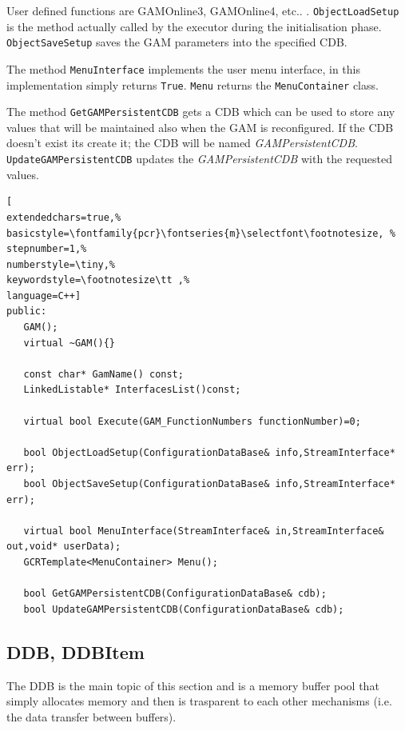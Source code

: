 User defined functions are GAMOnline3, GAMOnline4, etc.. . \texttt{ObjectLoadSetup} is the method actually called by the executor during the initialisation phase. \texttt{ObjectSaveSetup} saves the GAM parameters into the specified CDB.

The method \texttt{MenuInterface} implements the user menu interface, in this implementation simply returns \texttt{True}. \texttt{Menu} returns the \texttt{MenuContainer} class.

The method \texttt{GetGAMPersistentCDB} gets a CDB which can be used to store any values that will be maintained also when the GAM is reconfigured. If the CDB doesn't exist its create it; the CDB will be named \textit{GAMPersistentCDB}. \texttt{UpdateGAMPersistentCDB} updates the \textit{GAMPersistentCDB} with the requested values.

\begin{lstlisting}[
extendedchars=true,%
basicstyle=\fontfamily{pcr}\fontseries{m}\selectfont\footnotesize, %
stepnumber=1,%
numberstyle=\tiny,%
keywordstyle=\footnotesize\tt ,%
language=C++]
public:
   GAM();
   virtual ~GAM(){}

   const char* GamName() const;
   LinkedListable* InterfacesList()const;

   virtual bool Execute(GAM_FunctionNumbers functionNumber)=0;

   bool ObjectLoadSetup(ConfigurationDataBase& info,StreamInterface* err);
   bool ObjectSaveSetup(ConfigurationDataBase& info,StreamInterface* err);

   virtual bool MenuInterface(StreamInterface& in,StreamInterface& out,void* userData);
   GCRTemplate<MenuContainer> Menu();

   bool GetGAMPersistentCDB(ConfigurationDataBase& cdb);
   bool UpdateGAMPersistentCDB(ConfigurationDataBase& cdb);
\end{lstlisting}



\subsection{DDB, DDBItem}
The DDB is the main topic of this section and is a memory buffer pool that simply allocates memory and then is trasparent to each other mechanisms (i.e. the data transfer between buffers).

